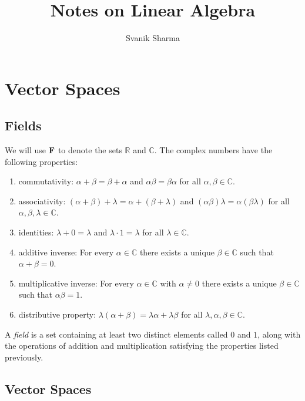 \documentclass{article}
\title{Notes on Linear Algebra}
\author{Svanik Sharma}
\begin{document}
\maketitle
\tableofcontents
\section{Vector Spaces}

\subsection{Fields}

We will use $\bf{F}$ to denote the sets $\mathbb{R}$ and
$\mathbb{C}$. The complex numbers have the following properties:

\begin{enumerate}
  \item commutativity: $\alpha + \beta = \beta + \alpha$ and
    $\alpha\beta = \beta\alpha$ for all $\alpha, \beta \in \mathbb{C}$.
  \item associativity: $(\alpha + \beta) + \lambda = \alpha + (\beta + \lambda)$ and $(\alpha\beta)\lambda = \alpha(\beta\lambda)$ for all $\alpha, \beta, \lambda \in \mathbb{C}$.
  \item identities: $\lambda + 0 = \lambda$ and $\lambda \cdot 1 = \lambda$ for all $\lambda \in \mathbb{C}$.
  \item additive inverse: For every $\alpha \in \mathbb{C}$ there exists a unique $\beta \in \mathbb{C}$ such that $\alpha + \beta = 0$.
  \item multiplicative inverse: For every $\alpha \in \mathbb{C}$ with $\alpha \ne 0$ there exists a unique $\beta \in \mathbb{C}$ such that $\alpha \beta = 1$.
  \item distributive property: $\lambda(\alpha + \beta) = \lambda \alpha + \lambda \beta$ for all $\lambda, \alpha, \beta \in \mathbb{C}$.
  \end{enumerate}

\begin{definition}[Field]
A \textit{field} is a set containing at least two distinct elements called $0$ and $1$, along with the operations of addition and multiplication satisfying the properties listed previously. 
\end{definition}

\subsection{Vector Spaces}
\end{document}
